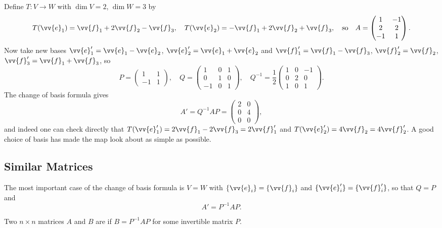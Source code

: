 \begin{example}
	Define $T: V \rightarrow W$ with $\dim V = 2$, $\dim W = 3$ by
	$$
	T(\vv{e}_1) = \vv{f}_1 + 2\vv{f}_2 - \vv{f}_3, \quad
	T(\vv{e}_2) = -\vv{f}_1 + 2\vv{f}_2 + \vv{f}_3,
	\quad \text{so} \quad
	A = \begin{pmatrix}
		1 & -1 \\ 2 & 2 \\ -1 & 1
	\end{pmatrix}.
	$$
	Now take new bases $\vv{e}_1' = \vv{e}_1 - \vv{e}_2$, $\vv{e}_2' = \vv{e}_1 + \vv{e}_2$ and $\vv{f}_1' = \vv{f}_1 - \vv{f}_3$, $\vv{f}_2' = \vv{f}_2$, $\vv{f}_3' = \vv{f}_1 + \vv{f}_3$, so
	$$
	P = \begin{pmatrix}
		1 & 1 \\ -1 & 1
	\end{pmatrix}, \quad
	Q = \begin{pmatrix}
		1 & 0 & 1 \\
		0 & 1 & 0 \\
		-1 & 0 & 1
	\end{pmatrix}, \quad
	Q^{-1} = \frac{1}{2}\begin{pmatrix}
		1 & 0 & -1 \\
		0 & 2 & 0 \\
		1 & 0 & 1
	\end{pmatrix}.
	$$
	The change of basis formula gives
	$$
	A' = Q^{-1}AP = \begin{pmatrix}
		2 & 0 \\ 0 & 4 \\ 0 & 0
	\end{pmatrix},
	$$
	and indeed one can check directly that $T(\vv{e}_1') = 2\vv{f}_1 - 2\vv{f}_3 = 2 \vv{f}_1'$ and $T(\vv{e}_2') = 4\vv{f}_2 = 4\vv{f}_2'$. A good choice of basis has made the map look about as simple as possible.
\end{example}

\subsection{Similar Matrices}

The most important case of the change of basis formula is $V = W$ with $\{\vv{e}_i\} = \{\vv{f}_i\}$ and $\{\vv{e}'_i\} = \{\vv{f}'_i\}$, so that $Q = P$ and
$$
A' = P^{-1}AP.
$$

\begin{definition}
	Two $n \times n$ matrices $A$ and $B$ are  if $B = P^{-1}AP$ for some invertible matrix $P$.
\end{definition}

